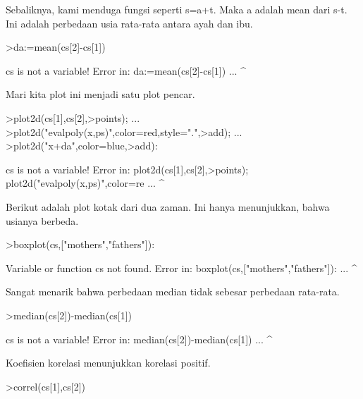 \documentclass{article}
\begin{document}
\begin{eulernotebook}
\begin{eulercomment}
\begin{eulercomment}
\begin{eulercomment}
Sebaliknya, kami menduga fungsi seperti s=a+t. Maka a adalah mean dari
s-t. Ini adalah perbedaan usia rata-rata antara ayah dan ibu.
\end{eulercomment}
\begin{eulerprompt}
>da:=mean(cs[2]-cs[1])
\end{eulerprompt}
\begin{euleroutput}
  cs is not a variable!
  Error in:
  da:=mean(cs[2]-cs[1]) ...
                ^
\end{euleroutput}
\begin{eulercomment}
Mari kita plot ini menjadi satu plot pencar.
\end{eulercomment}
\begin{eulerprompt}
>plot2d(cs[1],cs[2],>points);  ...
>plot2d("evalpoly(x,ps)",color=red,style=".",>add);  ...
>plot2d("x+da",color=blue,>add):
\end{eulerprompt}
\begin{euleroutput}
  cs is not a variable!
  Error in:
  plot2d(cs[1],cs[2],>points);  plot2d("evalpoly(x,ps)",color=re ...
              ^
\end{euleroutput}
\begin{eulercomment}
Berikut adalah plot kotak dari dua zaman. Ini hanya menunjukkan, bahwa
usianya berbeda.
\end{eulercomment}
\begin{eulerprompt}
>boxplot(cs,["mothers","fathers"]):
\end{eulerprompt}
\begin{euleroutput}
  Variable or function cs not found.
  Error in:
  boxplot(cs,["mothers","fathers"]): ...
            ^
\end{euleroutput}
\begin{eulercomment}
Sangat menarik bahwa perbedaan median tidak sebesar perbedaan
rata-rata.
\end{eulercomment}
\begin{eulerprompt}
>median(cs[2])-median(cs[1])
\end{eulerprompt}
\begin{euleroutput}
  cs is not a variable!
  Error in:
  median(cs[2])-median(cs[1]) ...
              ^
\end{euleroutput}
\begin{eulercomment}
Koefisien korelasi menunjukkan korelasi positif.
\end{eulercomment}
\begin{eulerprompt}
>correl(cs[1],cs[2])
\end{eulerprompt}

\end{eulercomment}
\end{eulercomment}
\end{eulernotebook}
\end{document}

